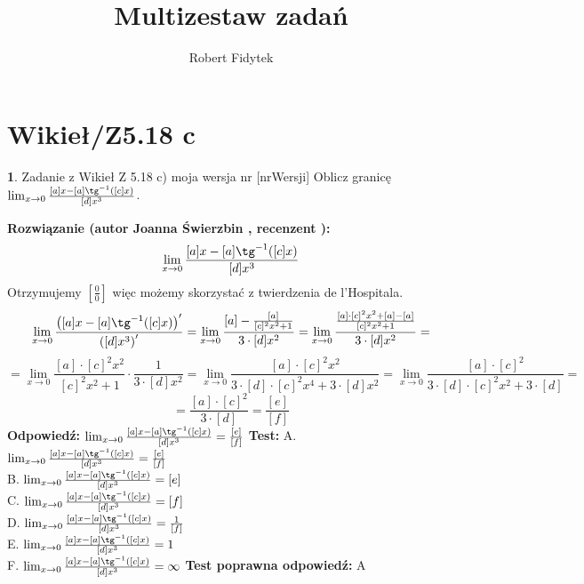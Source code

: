 \documentclass[12pt, a4paper]{article}
\title{Multizestaw zadań}
\author{Robert Fidytek}
\date{}
\theoremstyle{definition} %
\newtheorem{zad}{}
\newcommand{\kategoria}[1]{\section{#1}} %
\newcommand{\zadStart}[1]{\begin{zad}#1\newline} %
\newcommand{\zadStop}{\end{zad}}   %
\newcommand{\rozwStart}[2]{\noindent \textbf{Rozwiązanie (autor #1 , recenzent #2): }\newline} %
\newcommand{\rozwStop}{\newline}                                            %
\newcommand{\odpStart}{\noindent \textbf{Odpowiedź:}\newline}    %
\newcommand{\odpStop}{\newline}                                             %
\newcommand{\testStart}{\noindent \textbf{Test:}\newline} %
\newcommand{\testStop}{\newline} %
\newcommand{\kluczStart}{\noindent \textbf{Test poprawna odpowiedź:}\newline} %
\newcommand{\kluczStop}{\newline} %
\begin{document}
\maketitle


\kategoria{Wikieł/Z5.18 c}
\zadStart{Zadanie z Wikieł Z 5.18 c) moja wersja nr [nrWersji]}
Oblicz granicę $\lim_{x \rightarrow 0} \frac{[a]x-[a] \tg^{-1}([c]x)}{[d]x^3}$.
\zadStop
\rozwStart{Joanna Świerzbin}{}
$$ \lim_{x \rightarrow 0} \frac{[a]x-[a] \tg^{-1}([c]x)}{[d]x^3}$$
Otrzymujemy $ \left[ \frac{0}{0} \right] $ więc możemy skorzystać z twierdzenia de l'Hospitala.
$$ \lim_{x \rightarrow 0} \frac{\left([a]x-[a] \tg^{-1}([c]x)\right)'}{\left([d]x^3\right)'}=\lim_{x \rightarrow 0} \frac{[a]-\frac{[a]}{[c]^2x^2+1}}{3\cdot[d]x^2}=
\lim_{x \rightarrow 0} \frac{\frac{[a]\cdot[c]^2x^2+[a]-[a]}{[c]^2x^2+1}}{3\cdot[d]x^2}=$$
$$=\lim_{x \rightarrow 0} {\frac{[a]\cdot[c]^2x^2}{[c]^2x^2+1}}\cdot{\frac{1}{3\cdot[d]x^2}}= \lim_{x \rightarrow 0} {\frac{[a]\cdot[c]^2x^2}{3\cdot[d]\cdot [c]^2x^4+3\cdot[d]x^2}}= \lim_{x \rightarrow 0} {\frac{[a]\cdot[c]^2}{3\cdot[d]\cdot [c]^2x^2+3\cdot[d]}} =$$
 $$ = \frac{[a]\cdot[c]^2}{3\cdot[d]} = \frac{[e]}{[f]}$$
\rozwStop
\odpStart
$ \lim_{x \rightarrow 0} \frac{[a]x-[a] \tg^{-1}([c]x)}{[d]x^3} =  \frac{[e]}{[f]}$
\odpStop
\testStart
A. $ \lim_{x \rightarrow 0} \frac{[a]x-[a] \tg^{-1}([c]x)}{[d]x^3} =  \frac{[e]}{[f]}$\\
B. $ \lim_{x \rightarrow 0} \frac{[a]x-[a] \tg^{-1}([c]x)}{[d]x^3} =  [e]$\\
C. $ \lim_{x \rightarrow 0} \frac{[a]x-[a] \tg^{-1}([c]x)}{[d]x^3} =  [f]$\\
D. $ \lim_{x \rightarrow 0} \frac{[a]x-[a] \tg^{-1}([c]x)}{[d]x^3} =  \frac{1}{[f]}$\\
E. $ \lim_{x \rightarrow 0} \frac{[a]x-[a] \tg^{-1}([c]x)}{[d]x^3} =  1$\\
F. $ \lim_{x \rightarrow 0} \frac{[a]x-[a] \tg^{-1}([c]x)}{[d]x^3} =  \infty$
\testStop
\kluczStart
A
\kluczStop
\end{document}
